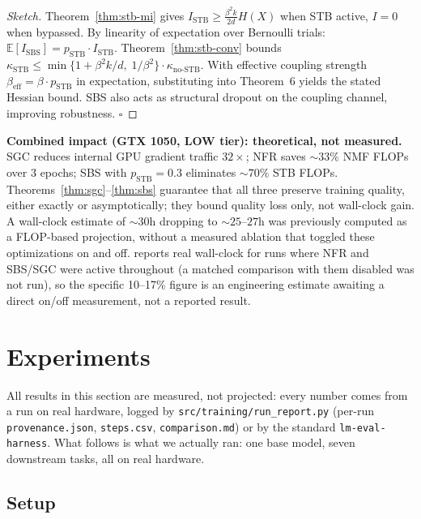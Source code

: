 \documentclass[conference]{IEEEtran}
\begin{document}
\begin{proof}[Sketch]
Theorem~\ref{thm:stb-mi} gives $I_{\text{STB}} \geq \frac{\beta^2 k}{2d} H(X)$ when STB active, $I=0$ when bypassed. By linearity of expectation over Bernoulli trials: $\mathbb{E}[I_{\text{SBS}}] = p_{\text{STB}} \cdot I_{\text{STB}}$. Theorem~\ref{thm:stb-conv} bounds $\kappa_{\text{STB}} \leq \min\{1+\beta^2 k/d,\; 1/\beta^2\} \cdot \kappa_{\text{no-STB}}$. With effective coupling strength $\beta_{\text{eff}} = \beta \cdot p_{\text{STB}}$ in expectation, substituting into Theorem~6 yields the stated Hessian bound. SBS also acts as structural dropout on the coupling channel, improving robustness. $\square$
\end{proof}

\textbf{Combined impact (GTX 1050, LOW tier): theoretical, not measured.} SGC reduces internal GPU gradient traffic $32\times$; NFR saves $\sim 33\%$ NMF FLOPs over 3 epochs; SBS with $p_{\text{STB}}=0.3$ eliminates $\sim 70\%$ STB FLOPs. Theorems~\ref{thm:sgc}--\ref{thm:sbs} guarantee that all three preserve training quality, either exactly or asymptotically; they bound quality loss only, not wall-clock gain. A wall-clock estimate of $\sim 30$h dropping to $\sim 25$--$27$h was previously computed as a FLOP-based projection, without a measured ablation that toggled these optimizations on and off.  reports real wall-clock for runs where NFR and SBS/SGC were active throughout (a matched comparison with them disabled was not run), so the specific 10--17\% figure is an engineering estimate awaiting a direct on/off measurement, not a reported result.

\section{Experiments}
\label{sec:experiments}

All results in this section are measured, not projected: every number comes from a run on real hardware, logged by \texttt{src/training/run\_report.py} (per-run \texttt{provenance.json}, \texttt{steps.csv}, \texttt{comparison.md}) or by the standard \texttt{lm-eval-harness}. What follows is what we actually ran: one base model, seven downstream tasks, all on real hardware.

\subsection{Setup}
\end{document}
